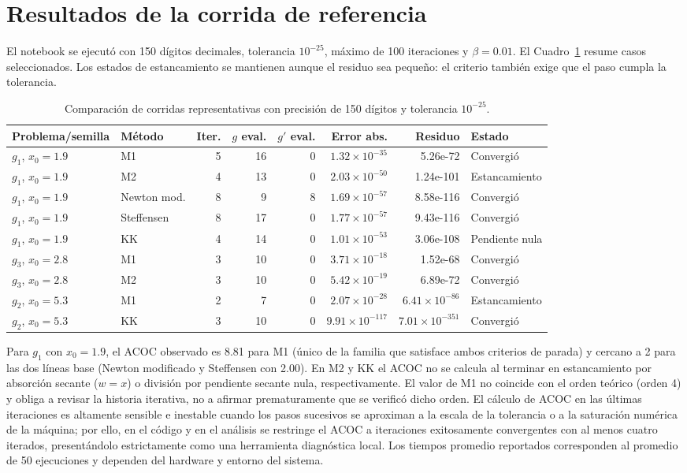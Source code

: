 \documentclass[10pt,a4paper]{article}
\begin{document}
\section{Resultados de la corrida de referencia}
El notebook se ejecutó con 150 d\'igitos decimales, tolerancia $10^{-25}$, m\'aximo de 100 iteraciones y $\beta=0.01$. El Cuadro~\ref{tab:resultados} resume casos seleccionados. Los estados de estancamiento se mantienen aunque el residuo sea peque\~no: el criterio tambi\'en exige que el paso cumpla la tolerancia.
\begin{table}[H]
\centering
\caption{Comparación de corridas representativas con precisi\'on de 150 d\'igitos y tolerancia $10^{-25}$.}
\label{tab:resultados}
\small
\begin{tabular}{llrrrrrl}
\toprule
Problema/semilla & Método & Iter. & $g$ eval. & $g'$ eval. & Error abs. & Residuo & Estado \\
\midrule
$g_1$, $x_0=1.9$ & M1 & 5 & 16 & 0 & $1.32\times10^{-35}$ & 5.26e-72 & Convergió \\
$g_1$, $x_0=1.9$ & M2 & 4 & 13 & 0 & $2.03\times10^{-50}$ & 1.24e-101 & Estancamiento \\
$g_1$, $x_0=1.9$ & Newton mod. & 8 & 9 & 8 & $1.69\times10^{-57}$ & 8.58e-116 & Convergió \\
$g_1$, $x_0=1.9$ & Steffensen & 8 & 17 & 0 & $1.77\times10^{-57}$ & 9.43e-116 & Convergió \\
$g_1$, $x_0=1.9$ & KK & 4 & 14 & 0 & $1.01\times10^{-53}$ & 3.06e-108 & Pendiente nula \\
$g_3$, $x_0=2.8$ & M1 & 3 & 10 & 0 & $3.71\times10^{-18}$ & 1.52e-68 & Convergió \\
$g_3$, $x_0=2.8$ & M2 & 3 & 10 & 0 & $5.42\times10^{-19}$ & 6.89e-72 & Convergió \\
$g_2$, $x_0=5.3$ & M1 & 2 & 7 & 0 & $2.07\times10^{-28}$ & $6.41\times10^{-86}$ & Estancamiento \\
$g_2$, $x_0=5.3$ & KK & 3 & 10 & 0 & $9.91\times10^{-117}$ & $7.01\times10^{-351}$ & Convergió \\
\bottomrule
\end{tabular}
\end{table}
Para $g_1$ con $x_0=1.9$, el ACOC observado es 8.81 para M1 (único de la familia que satisface ambos criterios de parada) y cercano a 2 para las dos l\'ineas base (Newton modificado y Steffensen con 2.00). En M2 y KK el ACOC no se calcula al terminar en estancamiento por absorción secante ($w=x$) o división por pendiente secante nula, respectivamente. El valor de M1 no coincide con el orden te\'orico (orden 4) y obliga a revisar la historia iterativa, no a afirmar prematuramente que se verificó dicho orden. El cálculo de ACOC en las últimas iteraciones es altamente sensible e inestable cuando los pasos sucesivos se aproximan a la escala de la tolerancia o a la saturación numérica de la máquina; por ello, en el código y en el análisis se restringe el ACOC a iteraciones exitosamente convergentes con al menos cuatro iterados, presentándolo estrictamente como una herramienta diagnóstica local. Los tiempos promedio reportados corresponden al promedio de 50 ejecuciones y dependen del hardware y entorno del sistema.
\end{document}
